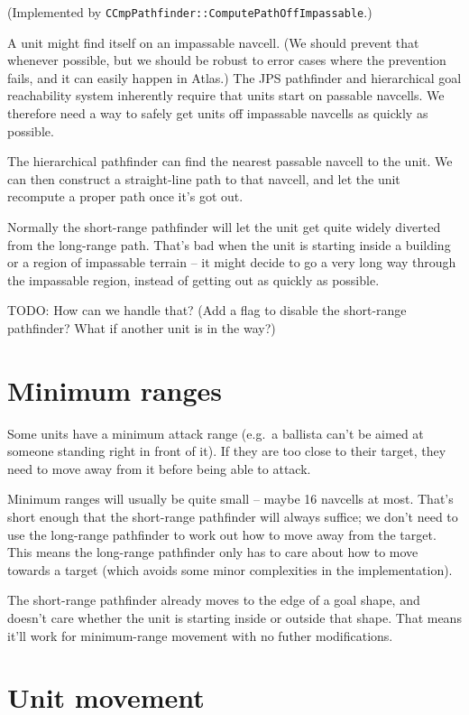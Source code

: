\documentclass[a4paper,10pt]{article}
\begin{document}
(Implemented by \texttt{CCmpPathfinder::ComputePathOffImpassable}.)

A unit might find itself on an impassable navcell.
(We should prevent that whenever possible,
but we should be robust to error cases where the prevention fails,
and it can easily happen in Atlas.)
The JPS pathfinder and hierarchical goal reachability system
inherently require that units start on passable navcells.
We therefore need a way to safely get units off impassable navcells as quickly as possible.

The hierarchical pathfinder can find the nearest passable navcell to the unit.
We can then construct a straight-line path to that navcell,
and let the unit recompute a proper path once it's got out.

Normally the short-range pathfinder will let the unit get quite widely diverted from the long-range path.
That's bad when the unit is starting inside a building or a region of impassable terrain --
it might decide to go a very long way through the impassable region,
instead of getting out as quickly as possible.

TODO: How can we handle that? (Add a flag to disable the short-range pathfinder?
What if another unit is in the way?)

\section{Minimum ranges}

Some units have a minimum attack range (e.g.\ a ballista can't be aimed
at someone standing right in front of it).
If they are too close to their target,
they need to move away from it before being able to attack.

Minimum ranges will usually be quite small -- maybe 16 navcells at most.
That's short enough that the short-range pathfinder will always suffice;
we don't need to use the long-range pathfinder to work out how to move
away from the target.
This means the long-range pathfinder only has to care about how to move
towards a target (which avoids some minor complexities in the implementation).

The short-range pathfinder already moves to the edge of a goal shape,
and doesn't care whether the unit is starting inside or outside that shape.
That means it'll work for minimum-range movement with no futher modifications.

\section{Unit movement}
\end{document}
